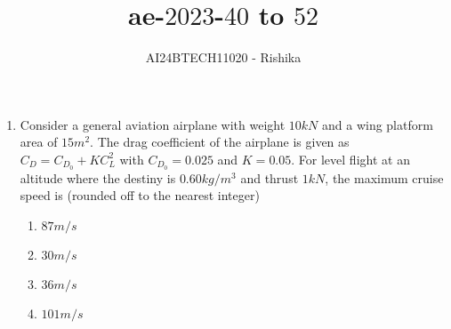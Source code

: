 \documentclass[journal,12pt,onecolumn]{IEEEtran}
\theoremstyle{remark}
\begin{document}

\vspace{3cm}

\title{ae-$2023$-$40$ to $52$}
\author{AI24BTECH11020 - Rishika}
\maketitle
\bigskip
\renewcommand{\thefigure}{\theenumi}
\renewcommand{\thetable}{\theenumi}
\begin{enumerate}[start=40]
	\item Consider a general aviation airplane with weight $10 kN$ and a wing platform area of $15 m^2$. The drag coefficient of the airplane is given as $C_D=C_{D_0}+KC_L^2$ with $C_{D_0}=0.025$ and $K=0.05$. For level flight at an altitude where the destiny is $0.60 kg/m^3$ and thrust $1 kN$, the maximum cruise speed is (rounded off to the nearest integer)
		\begin{enumerate}
			\item $87 m/s$
			\item $30 m/s$
			\item $36 m/s$
			\item $101 m/s$
		\end{enumerate}



\end{enumerate}
\end{document}

